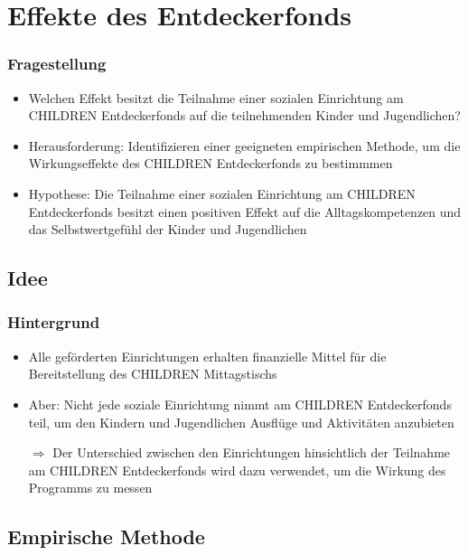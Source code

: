 \section{Effekte des Entdeckerfonds}

\begin{frame}[fragile]
\frametitle{Fragestellung}
\begin{itemize}
\item Welchen Effekt besitzt die Teilnahme einer sozialen Einrichtung am CHILDREN Entdeckerfonds auf die teilnehmenden Kinder und Jugendlichen?
\item Herausforderung: Identifizieren einer geeigneten empirischen Methode, um die Wirkungseffekte des CHILDREN Entdeckerfonds zu bestimmmen
\linebreak
\item Hypothese: Die Teilnahme einer sozialen Einrichtung am CHILDREN Entdeckerfonds besitzt einen positiven Effekt auf die Alltagskompetenzen und das Selbstwertgefühl der Kinder und Jugendlichen
\end{itemize}
\end{frame}

\subsection{Idee}

\begin{frame}[fragile]
\frametitle{Hintergrund}
\begin{itemize}
\item Alle geförderten Einrichtungen erhalten finanzielle Mittel für die Bereitstellung des CHILDREN Mittagstischs
\item Aber: Nicht jede soziale Einrichtung nimmt am CHILDREN Entdeckerfonds teil, um den Kindern und Jugendlichen Ausflüge und Aktivitäten anzubieten
\linebreak
\item [$\Rightarrow$] Der Unterschied zwischen den Einrichtungen hinsichtlich der Teilnahme am CHILDREN Entdeckerfonds wird dazu verwendet, um die Wirkung des Programms zu messen
\end{itemize}
\end{frame}

\subsection{Empirische Methode}

